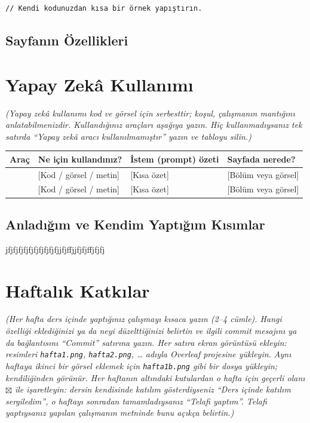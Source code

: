 \documentclass[12pt,a4paper]{article}
\newcommand{\aciklama}[1]{{\color{gray}\itshape (#1)}}
\begin{document}
\begin{lstlisting}[caption={İçsel JavaScript'ten önemli bir bölüm}]
// Kendi kodunuzdan kısa bir örnek yapıştırın.
\end{lstlisting}

\subsection{Sayfanın Özellikleri}


\section{Yapay Zekâ Kullanımı}
\aciklama{Yapay zekâ kullanımı kod ve görsel için serbesttir; koşul, çalışmanın mantığını
anlatabilmenizdir. Kullandığınız araçları aşağıya yazın. Hiç kullanmadıysanız tek
satırda ``Yapay zekâ aracı kullanılmamıştır'' yazın ve tabloyu silin.}

\begin{longtable}{@{}p{2.6cm}p{3.6cm}p{4.2cm}p{3.4cm}@{}}
\toprule
\textbf{Araç} & \textbf{Ne için kullandınız?} & \textbf{İstem (prompt) özeti} & \textbf{Sayfada nerede?} \\
\midrule
\endhead
{} & [Kod / görsel / metin] & [Kısa özet] & [Bölüm veya görsel] \\
 & [Kod / görsel / metin] & [Kısa özet] & [Bölüm veya görsel] \\
\bottomrule
\end{longtable}

\subsection{Anladığım ve Kendim Yaptığım Kısımlar}
jfjfjfjfjfjfjfjfjfjfjjfjffjjfjfjffjfjfj

\section{Haftalık Katkılar}
\aciklama{Her hafta ders içinde yaptığınız çalışmayı kısaca yazın (2--4 cümle). Hangi
özelliği eklediğinizi ya da neyi düzelttiğinizi belirtin ve ilgili commit mesajını
ya da bağlantısını ``Commit'' satırına yazın. Her satıra ekran görüntüsü ekleyin:
resimleri \texttt{hafta1.png}, \texttt{hafta2.png}, \ldots{} adıyla Overleaf
projesine yükleyin. Aynı haftaya ikinci bir görsel eklemek için
\texttt{hafta1b.png} gibi bir dosya yükleyin; kendiliğinden görünür.
Her haftanın altındaki kutulardan o hafta için geçerli olanı $\boxtimes$ ile
işaretleyin: dersin kendisinde katılım gösterdiyseniz ``Ders içinde katılım
sergiledim'', o haftayı sonradan tamamladıysanız ``Telafi yaptım''. Telafi
yaptıysanız yapılan çalışmanın metninde bunu açıkça belirtin.}
\end{document}
